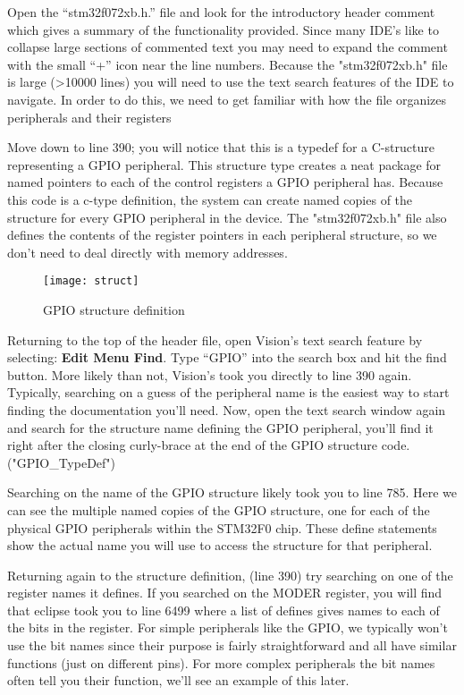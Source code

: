 \documentclass[11pt,fleqn]{book} %
\begin{document}
Open the ``stm32f072xb.h.'' file and look for the introductory header comment which gives a summary of the functionality provided. Since many IDE's like to collapse large sections of commented text you may need to expand the comment with the small ``+'' icon near the line numbers. Because the "stm32f072xb.h" file is large (>10000 lines) you will need to use the text search features of the IDE to navigate. In order to do this, we need to get familiar with how the file organizes peripherals and their registers

Move down to line 390; you will notice that this is a typedef for a C-structure representing a GPIO peripheral. This structure type creates a neat package for named pointers to each of the control registers a GPIO peripheral has. Because this code is a c-type definition, the system can create named copies of the structure for every GPIO peripheral in the device. The "stm32f072xb.h" file also defines the contents of the register pointers in each peripheral structure, so we don't need to deal directly with memory addresses.

\begin{figure}[]
    \centering\texttt{[image: struct]}
    \caption{GPIO structure definition}
    \label{struct}
\end{figure}

Returning to the top of the header file, open {\textmu}Vision's text search feature by selecting: \textbf{Edit Menu \textrightarrow Find}. Type ``GPIO'' into the search box and hit the find button. More likely than not, {\textmu}Vision's took you directly to line 390 again. Typically, searching on a guess of the peripheral name is the easiest way to start finding the documentation you'll need. Now, open the text search window again and search for the structure name defining the GPIO peripheral, you'll find it right after the closing curly-brace at the end of the GPIO structure code. ("GPIO\_TypeDef")

Searching on the name of the GPIO structure likely took you to line 785. Here we can see the multiple named copies of the GPIO structure, one for each of the physical GPIO peripherals within the STM32F0 chip. These define statements show the actual name you will use to access the structure for that peripheral.

Returning again to the structure definition, (line 390) try searching on one of the register names it defines. If you searched on the MODER register, you will find that eclipse took you to line 6499 where a list of defines gives names to each of the bits in the register. For simple peripherals like the GPIO, we typically won't use the bit names since their purpose is fairly straightforward and all have similar functions (just on different pins). For more complex peripherals the bit names often tell you their function, we'll see an example of this later.
\end{document}
